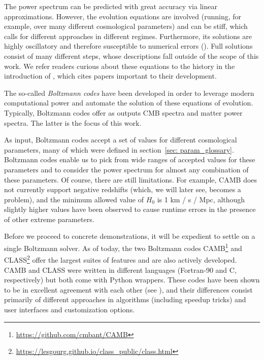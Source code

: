
The power spectrum can be predicted with great accuracy via linear 
approximations. However, the evolution equations are involved (running, for
example, over many different cosmological parameters) and can be
stiff, which calls for different approaches in different regimes. Furthermore,
its solutions are highly oscillatory and therefore susceptible to numerical
errors (). Full solutions consist of many different steps, whose
descriptions fall outside of the scope of this work. We refer readers curious
about these equations to the history in the introduction of ,
which cites papers important to their development. 


The so-called \textit{Boltzmann codes} have been 
developed in order to leverage modern computational power and automate the
solution of these equations of evolution. Typically, Boltzmann codes offer as
outputs CMB spectra and matter power spectra. The latter is the focus of this
work.


As input, Boltzmann codes accept a set of values for different 
cosmological parameters, many of which were defined in section~\ref{sec: 
param_glossary}. Boltzmann codes enable us to pick from wide ranges of 
accepted values for these parameters and to consider the power 
spectrum for almost any combination of these parameters. Of course, there are 
still limitations. For example, CAMB does not currently support negative 
redshifts (which, we will later see, becomes a problem), and the minimum 
allowed value of $H_0$ is 1 km / s / Mpc, although slightly higher values have 
been observed to cause runtime errors in the presence of other extreme 
parameters.


Before we proceed to concrete demonstrations, it will be expedient to settle
on a single Boltzmann solver. As of today, the two Boltzmann codes
CAMB\footnote{\url{https://github.com/cmbant/CAMB}} and
CLASS\footnote{\url{https://lesgourg.github.io/class_public/class.html}} offer
the largest suites of features and are also actively developed. CAMB and
CLASS were written in different languages (Fortran-90 and C, respectively)
but both come with Python wrappers. These codes have been shown to be in 
excellent agreement with each other (see ), and their
differences consist primarily of different approaches in algorithms (including 
speedup tricks) and user interfaces and customization options.

